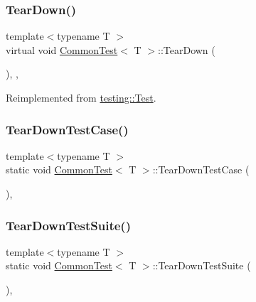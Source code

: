 \subsubsection{\texorpdfstring{TearDown()}{TearDown()}\hspace{0.1cm}{\footnotesize\ttfamily [3/3]}}
{\footnotesize\ttfamily template$<$typename T $>$ \\
virtual void \mbox{\hyperlink{class_common_test}{Common\+Test}}$<$ T $>$\+::Tear\+Down (\begin{DoxyParamCaption}{ }\end{DoxyParamCaption})\hspace{0.3cm}{\ttfamily [inline]}, {\ttfamily [protected]}, {\ttfamily [virtual]}}



Reimplemented from \mbox{\hyperlink{classtesting_1_1_test_a5f0ab439802cbe0ef7552f1a9f791923}{testing\+::\+Test}}.

\mbox{\label{class_common_test_a68d2bf5108cf28478331588fbdff4838}} 
\subsubsection{\texorpdfstring{TearDownTestCase()}{TearDownTestCase()}}
{\footnotesize\ttfamily template$<$typename T $>$ \\
static void \mbox{\hyperlink{class_common_test}{Common\+Test}}$<$ T $>$\+::Tear\+Down\+Test\+Case (\begin{DoxyParamCaption}{ }\end{DoxyParamCaption})\hspace{0.3cm}{\ttfamily [inline]}, {\ttfamily [static]}}

\mbox{\label{class_common_test_a1ed5842244ccca6c3bee6eb9e3b8bc9b}} 
\subsubsection{\texorpdfstring{TearDownTestSuite()}{TearDownTestSuite()}\hspace{0.1cm}{\footnotesize\ttfamily [1/2]}}
{\footnotesize\ttfamily template$<$typename T $>$ \\
static void \mbox{\hyperlink{class_common_test}{Common\+Test}}$<$ T $>$\+::Tear\+Down\+Test\+Suite (\begin{DoxyParamCaption}{ }\end{DoxyParamCaption})\hspace{0.3cm}{\ttfamily [inline]}, {\ttfamily [static]}}

